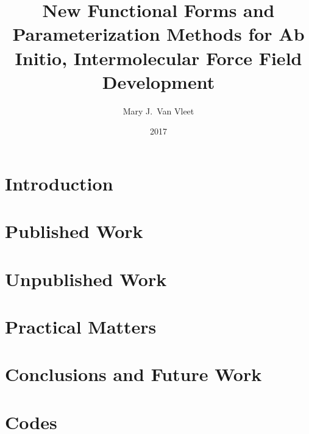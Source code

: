 \documentclass[12pt,oneside,letterpaper]{memoir}
\title{
New Functional Forms and Parameterization Methods for Ab Initio, Intermolecular Force Field Development
}
\author{Mary J.~Van Vleet}
\date{2017}
\begin{document}

\ifpdf
{}
\else
{}
\fi

\maketitle
\restoregeometry %




\part{Introduction}
\glsresetall %



\part{Published Work}
\glsresetall 

\glsresetall 


\part{Unpublished Work}
\glsresetall 

\glsresetall 


\part{Practical Matters}



\part{Conclusions and Future Work}



\part{Codes}

% 
\end{document}
